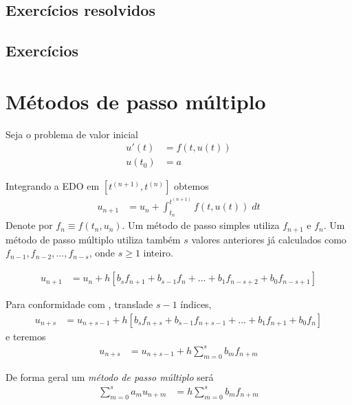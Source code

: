 \subsection*{Exercícios resolvidos}

\emconstrucao

\subsection*{Exercícios}

\emconstrucao

\section{Métodos de passo múltiplo}
Seja o problema de valor inicial
\begin{eqnarray}
  u'(t) &= f(t,u(t)) \\
  u(t_0) &= a
\end{eqnarray}


Integrando a EDO em $[t^{(n+1)},t^{(n)}]$ obtemos
\begin{eqnarray}
  u_{n+1}  &= u_n  + \int _{t_n}^{t^{(n+1)}} f(t,u(t)) \; dt
\end{eqnarray}
Denote por $f_n\equiv f(t_n,u_n)$. Um método de passo simples utiliza $f_{n+1}$ e $f_{n}$. Um método de passo múltiplo utiliza também $s$ valores anteriores já calculados como $f_{n-1},f_{n-2},\ldots ,f_{n-s}$, onde $s\geq 1$ inteiro.

\begin{eqnarray}
  u_{n+1}  &= u_{n}  + h[b_s f_{n+1}+b_{s-1}f_{n}+\ldots +b_1f_{n-s+2}+b_0f_{n-s+1}]
\end{eqnarray}

Para conformidade com \cite{iserles2009first}, translade $s-1$ índices,
\begin{eqnarray}
  u_{n+s}  &= u_{n+s-1}  + h[b_s f_{n+s}+b_{s-1}f_{n+s-1}+\ldots +b_1f_{n+1}+b_0f_n] \label{multiad}
\end{eqnarray}
e teremos
\begin{eqnarray}
  u_{n+s}  &= u_{n+s-1}  + h \sum_{m=0}^s b_m f_{n+m}
\end{eqnarray}

De forma geral um \emph{método de passo múltiplo} será
\begin{eqnarray}
  \sum_{m=0}^s a_m u_{n+m}  &=  h \sum_{m=0}^s b_m f_{n+m}
\end{eqnarray}

